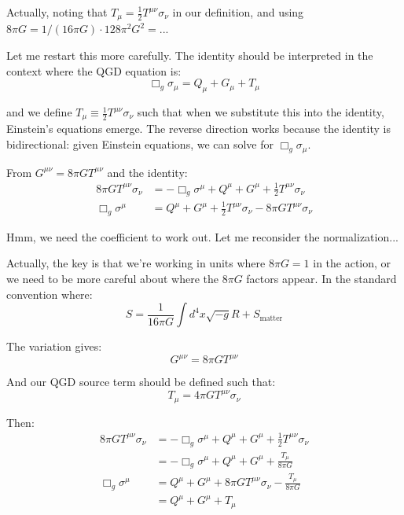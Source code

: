 \documentclass[11pt,a4paper]{article}
\theoremstyle{definition}
\theoremstyle{remark}
\begin{document}
		Actually, noting that $T_\mu = \frac{1}{2}T^{\mu\nu}\sigma_\nu$ in our definition, and using $8\pi G = 1/(16\pi G) \cdot 128\pi^2 G^2 = ...$ 
		
		Let me restart this more carefully. The identity should be interpreted in the context where the QGD equation is:
		\begin{equation}
			\Box_g\sigma_\mu = Q_\mu + G_\mu + T_\mu
		\end{equation}
		
		and we define $T_\mu \equiv \frac{1}{2}T^{\mu\nu}\sigma_\nu$ such that when we substitute this into the identity, Einstein's equations emerge. The reverse direction works because the identity is bidirectional: given Einstein equations, we can solve for $\Box_g\sigma_\mu$.
		
		From $G^{\mu\nu} = 8\pi GT^{\mu\nu}$ and the identity:
		\begin{align}
			8\pi GT^{\mu\nu}\sigma_\nu &= -\Box_g\sigma^\mu + Q^\mu + G^\mu + \frac{1}{2}T^{\mu\nu}\sigma_\nu\\
			\Box_g\sigma^\mu &= Q^\mu + G^\mu + \frac{1}{2}T^{\mu\nu}\sigma_\nu - 8\pi GT^{\mu\nu}\sigma_\nu
		\end{align}
		
		Hmm, we need the coefficient to work out. Let me reconsider the normalization...
		
		Actually, the key is that we're working in units where $8\pi G = 1$ in the action, or we need to be more careful about where the $8\pi G$ factors appear. In the standard convention where:
		\begin{equation}
			S = \frac{1}{16\pi G}\int d^4x\sqrt{-g}R + S_{\text{matter}}
		\end{equation}
		
		The variation gives:
		\begin{equation}
			G^{\mu\nu} = 8\pi GT^{\mu\nu}
		\end{equation}
		
		And our QGD source term should be defined such that:
		\begin{equation}
			T_\mu = 4\pi G T^{\mu\nu}\sigma_\nu
		\end{equation}
		
		Then:
		\begin{align}
			8\pi GT^{\mu\nu}\sigma_\nu &= -\Box_g\sigma^\mu + Q^\mu + G^\mu + \frac{1}{2}T^{\mu\nu}\sigma_\nu\\
			&= -\Box_g\sigma^\mu + Q^\mu + G^\mu + \frac{T_\mu}{8\pi G}\\
			\Box_g\sigma^\mu &= Q^\mu + G^\mu + 8\pi GT^{\mu\nu}\sigma_\nu - \frac{T_\mu}{8\pi G}\\
			&= Q^\mu + G^\mu + T_\mu
		\end{align}
		
\end{document}
